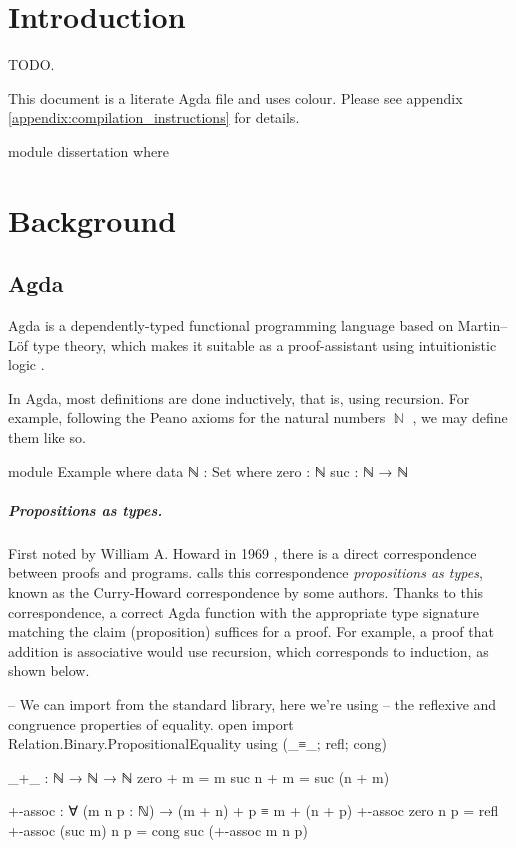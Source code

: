 \documentclass[logo,bsc,singlespacing,parskip,online]{infthesis}
\DeclareMathOperator{\nat}{\mathbb{N}}
\renewenvironment{code}{\mintedcopy[breaklines,breaksymbolleft=\;]{agda}}{\endmintedcopy}
\begin{document}
\chapter{Introduction}

TODO.

This document is a literate Agda file and uses {\color{violet}colour}. Please see appendix
\ref{appendix:compilation_instructions} for details.

\begin{code}
module dissertation where
\end{code}

\chapter{Background}

\section{Agda}
Agda is a dependently-typed functional programming language based on Martin--Löf type theory, which
makes it suitable as a proof-assistant using intuitionistic logic \citep{norell_towards_2007}.

In Agda, most definitions are done inductively, that is, using recursion. For example, following the
Peano axioms for the natural numbers $\nat$ \citep{boolos_freges_1995}, we may define them like so.

\begin{code}
module Example where
  data ℕ : Set where
    zero : ℕ
    suc  : ℕ → ℕ
\end{code}


\paragraph*{Propositions as types.} First noted by William A. Howard in 1969
\citep{howard_formulae-as-types_1980}, there is a direct correspondence between proofs and programs.
\citet{wadler_propositions_2015} calls this correspondence \textit{propositions as types}, known as
the Curry-Howard correspondence by some authors. Thanks to this correspondence, a correct Agda
function with the appropriate type signature matching the claim (proposition) suffices for a proof.
For example, a proof that addition is associative would use recursion, which corresponds to
induction, as shown below.

\begin{code}
  -- We can import from the standard library, here we're using
  -- the reflexive and congruence properties of equality.
  open import Relation.Binary.PropositionalEquality
    using (_≡_; refl; cong)

  _+_ : ℕ → ℕ → ℕ
  zero  + m = m
  suc n + m = suc (n + m)

  +-assoc : ∀ (m n p : ℕ) → (m + n) + p ≡ m + (n + p)
  +-assoc zero    n p = refl
  +-assoc (suc m) n p = cong suc (+-assoc m n p)
\end{code}
\end{document}
